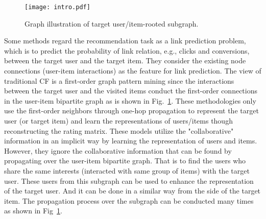 \begin{figure}[h]
	\centering
	\texttt{[image: intro.pdf]}
	\caption{Graph illustration of target user/item-rooted subgraph.}
	\label{fig:bi-graph}
\end{figure}
Some methods \cite{niu2018collaborative,talasu2017link,ying2018graph,fadel2018link,van2017graph,wu2019session} regard the recommendation task as a link prediction problem, which is to predict the probability of link relation, e.g., clicks and conversions, between the target user and the target item.
They consider the existing node connections (user-item interactions) as the feature for link prediction.
The view of traditional CF is a first-order graph pattern mining since the interactions between the target user and the visited items conduct the first-order connections in the user-item bipartite graph as is shown in Fig.~\ref{fig:bi-graph}. 
These methodologies only use the first-order neighbors through one-hop propagation to represent the target user (or target item) and learn the representations of users/items though reconstructing the rating matrix.
These models utilize the "collaborative" information in an implicit way by learning the representation of users and items. However, they ignore the collaborative information that can be found by propagating over the user-item bipartite graph.
That is to find the users who share the same interests  (interacted with same group of items) with the target user.
These users from this subgraph can be used to enhance the representation of the target user. And it can be done in a similar way from the side of the target item. The propagation process over the subgraph can be conducted many times as shown in Fig~\ref{fig:bi-graph}.

